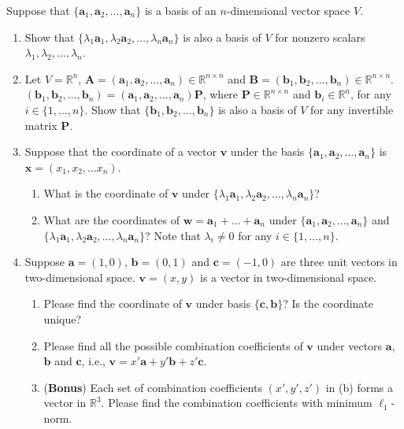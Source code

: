 \documentclass[11pt,letter,notitlepage]{article}
\theoremstyle{definition}
\begin{document}
\newpage
	\begin{exercise}
		Suppose that $\{\mathbf{a}_1, \mathbf{a}_2,\dots,\mathbf{a}_n\}$ is a basis of an $n$-dimensional vector space $V$.
		\begin{enumerate}
			\item Show that $\{\lambda_1 \mathbf{a}_1, \lambda_2 \mathbf{a}_2, \dots, \lambda_n\mathbf{a}_n\}$ is also a basis of $V$ for nonzero scalars $\lambda_1,\lambda_2, \dots, \lambda_n$.
			\item Let $V =\mathbb{R}^n$, $\mathbf{A}=(\mathbf{a}_1,\mathbf{a}_2, \dots, \mathbf{a}_n)\in\mathbb{R}^{n\times n}$ and $\mathbf{B}=(\mathbf{b}_1,\mathbf{b}_2,\dots, \mathbf{b}_n)\in\mathbb{R}^{n\times n}$. $(\mathbf{b}_1,\mathbf{b}_2,\dots, \mathbf{b}_n) = (\mathbf{a}_1,\mathbf{a}_2, \dots, \mathbf{a}_n)\mathbf{P}$, where $\mathbf{P}\in \mathbb{R}^{n\times n}$ and $\mathbf{b}_i\in \mathbb{R}^n$, for any $i\in\{1,\dots,n\}$. Show that $\{ \mathbf{b}_1, \mathbf{b}_2, \dots, \mathbf{b}_n\}$ is also a basis of $V$ for any invertible  matrix $\mathbf{P}$.
			\item Suppose that the coordinate of a vector $\mathbf{v}$ under the basis $\{\mathbf{a}_1,  \mathbf{a}_2,\dots,\mathbf{a}_n\}$ is $\mathbf{x}=(x_1,x_2,\dots x_n)$.
			\begin{enumerate}
				\item What is the coordinate of $\mathbf{v}$ under $\{\lambda_1 \mathbf{a}_1, \lambda_2 \mathbf{a}_2, \dots, \lambda_n\mathbf{a}_n\}$?
				
				\item What are the coordinates of $\mathbf{w} = \mathbf{a}_1+\dots + \mathbf{a}_n$ under $\{\mathbf{a}_1, \mathbf{a}_2,\dots,\mathbf{a}_n\}$ and $\{\lambda_1 \mathbf{a}_1, \lambda_2 \mathbf{a}_2, \dots, \lambda_n\mathbf{a}_n\}$? Note that  $\lambda_i \neq 0$ for any $i\in \{1,\dots,n\}$.
			\end{enumerate}
                \item Suppose $\mathbf{a}=(1,0)$, $\mathbf{b}=(0,1)$ and $\mathbf{c}=(-1,0)$ are three unit vectors in two-dimensional space. $\mathbf{v}=(x,y)$ is a vector in two-dimensional space.
                \begin{enumerate}
                    \item Please find the coordinate of $\mathbf{v}$ under basis $\{\mathbf{c}, \mathbf{b}\}$? Is the coordinate unique?
                    \item Please find all the possible combination coefficients of $\mathbf{v}$ under vectors $\mathbf{a}$, $\mathbf{b}$ and $\mathbf{c}$, i.e., $\mathbf{v} = x'\mathbf{a}+y'\mathbf{b}+z'\mathbf{c}$. 
                    \item (\textbf{Bonus}) Each set of combination coefficients $(x',y',z')$ in (b) forms a vector in $\mathbb{R}^3$. Please find the combination coefficients with minimum $\ell_1$-norm.
                \end{enumerate}
		\end{enumerate}
	\end{exercise}
\end{document}
